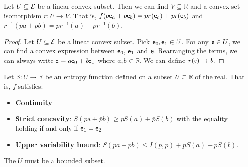 \begin{prop}
	Let $U \subseteq \mathcal{E}$ be a linear convex subset. Then we can find $V \subseteq \mathbb{R}$ and a convex set isomorphism $r : U \to V$. That is, $f(p \mathsf{e}_a + \bar{p} \mathsf{e}_b) = p r(\mathsf{e}_a) + \bar{p} r(\mathsf{e}_b)$ and $r^{-1} (p a + \bar{p} b) = p r^{-1} (a) + \bar{p} r^{-1} (b)$.
\end{prop}

\begin{proof}
	Let $U \subseteq \mathcal{E}$ be a linear convex subset. Pick $\mathsf{e}_0, \mathsf{e}_1 \in U$. For any $\mathsf{e} \in U$, we can find a convex expression between $\mathsf{e}_0$, $\mathsf{e}_1$ and $\mathsf{e}$. Rearranging the terms, we can always write $\mathsf{e} = a\mathsf{e}_0 + b\mathsf{e}_1$ where $a,b \in \mathbb{R}$. We can define $r(\mathsf{e}) \mapsto b$.
\end{proof}

\begin{prop}
	Let $S : U \to \mathbb{R}$ be an entropy function defined on a subset $U \subseteq \mathbb{R}$ of the real. That is, $f$ satisfies:
	\begin{itemize}
		\item \textbf{Continuity}
		\item \textbf{Strict concavity}: $S(p a + \bar{p} b) \geq p S(a) + \bar{p} S(b)$ with the equality holding if and only if $\mathsf{e}_1 = \mathsf{e}_2$
		\item \textbf{Upper variability bound}: $S(p a + \bar{p} b) \leq I(p, \bar{p}) + p S(a) + \bar{p} S(b)$.
	\end{itemize}
	The $U$ must be a bounded subset.
\end{prop}

